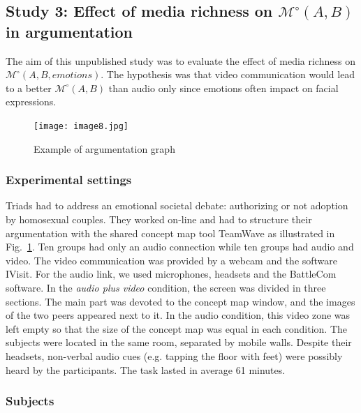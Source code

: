 \documentclass[natbib]{svjour3}
\newcommand{\eg}{e.g.\xspace}
\newcommand{\Model}[3]{{$\mathcal{M}^{\circ}(#1, #2, #3)$}}
\newcommand{\gModel}[2]{{$\mathcal{M}^{\circ}(#1, #2)$}}
\begin{document}
\subsection{{\bf Study 3}:  Effect of media richness on \gModel{A}{B} in argumentation}

%
The aim of this unpublished study was to evaluate the effect of media richness
on \Model{A}{B}{emotions}.  The hypothesis was that video communication would
lead to a better \gModel{A}{B} than audio only since emotions often impact on
facial expressions.

\begin{figure}[ht!]
        \centering
        \texttt{[image: image8.jpg]}
        \caption{Example of argumentation graph}
        \label{study3:argumentation_graph}
\end{figure}


\subsubsection*{Experimental settings} 

Triads had to address an emotional societal debate: authorizing or not adoption
by homosexual couples. They worked on-line and had to structure their
argumentation with the shared concept map tool {\sc TeamWave} as illustrated in
Fig.~\ref{study3:argumentation_graph}. Ten groups had only an audio connection
while ten groups had audio and video. The video communication was provided by a
webcam and the software {\sc IVisit}. For the audio link, we used microphones,
headsets and the {\sc BattleCom} software. In the \emph{audio plus video}
condition, the screen was divided in three sections. The main part was devoted
to the concept map window, and the images of the two peers appeared next to it.
In the audio condition, this video zone was left empty so that the size of the
concept map was equal in each condition. The subjects were located in the same
room, separated by mobile walls. Despite their headsets, non-verbal audio cues
(\eg tapping the floor with feet) were possibly heard by the participants. The
task lasted in average 61 minutes.

\subsubsection*{Subjects}
\end{document}
